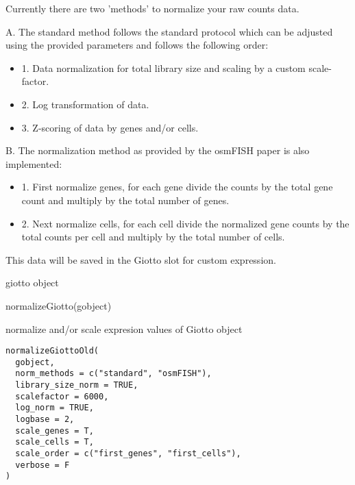 \documentclass[a4paper]{book}
\begin{document}
\begin{Details}\relax
Currently there are two 'methods' to normalize your raw counts data.

A. The standard method follows the standard protocol which can be adjusted using
the provided parameters and follows the following order: \\{}
\begin{itemize}

\item{} 1. Data normalization for total library size and scaling by a custom scale-factor.
\item{} 2. Log transformation of data.
\item{} 3. Z-scoring of data by genes and/or cells.

\end{itemize}

B. The normalization method as provided by the osmFISH paper is also implemented: \\{}
\begin{itemize}

\item{} 1. First normalize genes, for each gene divide the counts by the total gene count and
multiply by the total number of genes.
\item{} 2. Next normalize cells, for each cell divide the normalized gene counts by the total
counts per cell and multiply by the total number of cells.

\end{itemize}

This data will be saved in the Giotto slot for custom expression.
\end{Details}
%
\begin{Value}
giotto object
\end{Value}
%
\begin{Examples}
\begin{ExampleCode}
    normalizeGiotto(gobject)
\end{ExampleCode}
\end{Examples}
%
\begin{Description}\relax
normalize and/or scale expresion values of Giotto object
\end{Description}
%
\begin{Usage}
\begin{verbatim}
normalizeGiottoOld(
  gobject,
  norm_methods = c("standard", "osmFISH"),
  library_size_norm = TRUE,
  scalefactor = 6000,
  log_norm = TRUE,
  logbase = 2,
  scale_genes = T,
  scale_cells = T,
  scale_order = c("first_genes", "first_cells"),
  verbose = F
)
\end{verbatim}
\end{Usage}
\end{document}
